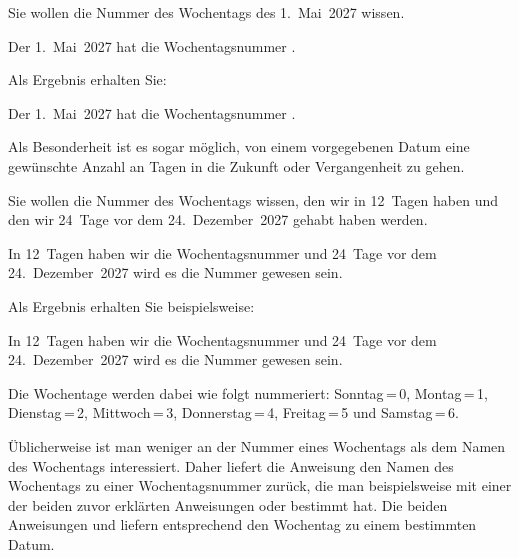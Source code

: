 \begin{Example}
  Sie wollen die Nummer des Wochentags des 1.~Mai~2027 wissen.
\begin{lstcode}
  Der 1.~Mai~2027 hat die Wochentagsnummer 
  \the{}.
\end{lstcode}
  Als Ergebnis erhalten Sie:
  \begin{ShowOutput}
    Der 1.~Mai~2027 hat die Wochentagsnummer 
    \the{}.
  \end{ShowOutput}
\end{Example}

Als Besonderheit ist es sogar möglich, von einem vorgegebenen Datum eine
gewünschte Anzahl an Tagen in die Zukunft oder Vergangenheit zu gehen.
\begin{Example}
  Sie wollen die Nummer des Wochentags wissen, den wir in 12~Tagen haben und
  den wir 24~Tage vor dem 24.~Dezember~2027 gehabt haben werden.
\begin{lstcode}
  In 12~Tagen haben wir die Wochentagsnummer
  \the{} und
  24~Tage vor dem 24.~Dezember~2027 wird es
  die Nummer \the{}
  gewesen sein.
\end{lstcode}
  Als Ergebnis erhalten Sie beispielsweise:
  \begin{ShowOutput}
  In 12~Tagen haben wir die Wochentagsnummer
  \the{} und
  24~Tage vor dem 24.~Dezember~2027 wird es
  die Nummer \the{}
  gewesen sein.
  \end{ShowOutput}
\end{Example}

Die Wochentage werden dabei wie folgt nummeriert: Sonntag\,=\,0, Montag\,=\,1,
Dienstag\,=\,2, Mittwoch\,=\,3, Donnerstag\,=\,4, Freitag\,=\,5 und
Samstag\,=\,6.%
%
\EndIndexGroup


\begin{Declaration}
\end{Declaration}%
Üblicherweise ist man weniger an der
Nummer eines Wochentags als dem Namen des Wochentags interessiert. Daher
liefert die Anweisung  den Namen des Wochentags zu
einer Wochentagsnummer zurück, die man beispielsweise mit einer der beiden
zuvor erklärten Anweisungen  oder
 bestimmt hat. Die beiden Anweisungen
 und  liefern entsprechend den Wochentag zu
einem bestimmten Datum.

